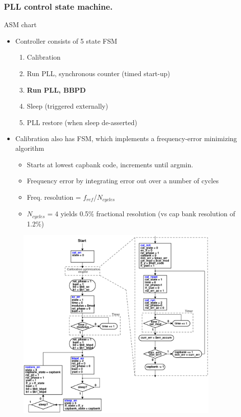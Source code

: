 \documentclass[t, screen, aspectratio=43]{beamer}
\begin{document}
\begin{frame}
	\frametitle{PLL control state machine.}
	\begin{block}{ASM chart}
		\begin{minipage}{5cm}
			\vspace{1em}
			\tiny
			\begin{itemize}[itemsep=4pt,label=\protect---]
			        \item Controller consists of 5 state FSM
					\begin{enumerate}[itemsep=4pt,label=\arabic*]
						\item Calibration
						\item Run PLL, synchronous counter (timed start-up)
						\item \textbf{Run PLL, BBPD} 
						\item Sleep (triggered externally)
						\item PLL restore (when sleep de-asserted)
					\end{enumerate}
					\item Calibration also has FSM, which implements a frequency-error minimizing algorithm 
					\begin{itemize}[itemsep=4pt,label=$\bullet$]
						\item Starts at lowest capbank code, increments until argmin.
						\item Frequency error by integrating error out over a number of cycles
						\item Freq. resolution = $f_{ref}$/$N_{cycles}$
						\item $N_{cycles}$ = 4 yields 0.5\% fractional resolution (vs cap bank resolution of 1.2\%)
					\end{itemize}
			\end{itemize}
		\end{minipage}%
		\begin{minipage}{7cm}
			\begin{figure}[htb!]
			        \centering
			        \includegraphics[width=0.9\textwidth, angle=0]{pll_asm}

\end{figure}
\end{minipage}
\end{block}
\end{frame}
\end{document}
